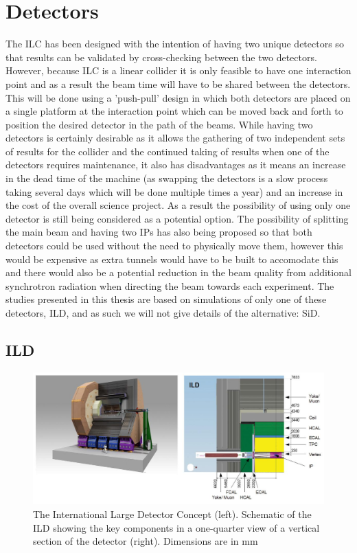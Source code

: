 \section{Detectors}
The \ac{ILC} has been designed with the intention of having two unique detectors so that results can be validated by cross-checking between the two detectors. However, because \ac{ILC} is a linear collider it is only feasible to have one interaction point and as a result the beam time will have to be shared between the detectors. This will be done using a 'push-pull' design in which both detectors are placed on a single platform at the interaction point which can be moved back and forth to position the desired detector in the path of the beams. While having two detectors is certainly desirable as it allows the gathering of two independent sets of results for the collider and the continued taking of results when one of the detectors requires maintenance, it also has disadvantages as it means an increase in the dead time of the machine (as swapping the detectors is a slow process taking several days which will be done multiple times a year) and an increase in the cost of the overall science project. As a result the possibility of using only one detector is still being considered as a potential option. The possibility of splitting the main beam and having two IPs has also being proposed so that both detectors could be used without the need to physically move them, however this would be expensive as extra tunnels would have to be built to accomodate this and there would also be a potential reduction in the beam quality from additional synchrotron radiation when directing the beam towards each experiment. The studies presented in this thesis are based on simulations of only one of these detectors, \ac{ILD}\cite{ILD}, and as such we will not give details of the alternative: \ac{SiD}\cite{Aihara:2009ad}. 

\subsection{ILD}
\begin{figure}
  \centering
  \includegraphics[width=1.0\textwidth,keepaspectratio]{Experiments/fig/ILD}
  \caption[ILD Detector]{The International Large Detector Concept (left). Schematic of the ILD showing the key components in a one-quarter view of a vertical section of the detector (right). Dimensions are in mm \cite{Behnke:2013xla}}
  \label{Fig:ILD}
\end{figure}


